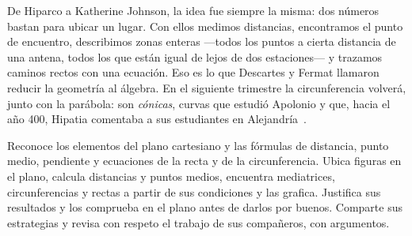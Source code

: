 \documentclass[11pt]{article}
\begin{document}

De Hiparco a Katherine Johnson, la idea fue siempre la misma: dos números
bastan para ubicar un lugar. Con ellos medimos distancias, encontramos el punto
de encuentro, describimos zonas enteras —todos los puntos a cierta distancia de
una antena, todos los que están igual de lejos de dos estaciones— y trazamos caminos
rectos con una ecuación. Eso es lo que Descartes y Fermat llamaron reducir la
geometría al álgebra. En el siguiente trimestre la circunferencia volverá, junto
con la parábola: son \emph{cónicas}, curvas que estudió Apolonio y que, hacia el
año 400, Hipatia comentaba a sus estudiantes en Alejandría~\cite{dzielska}.

\matrizevaluacion
  {Reconoce los elementos del plano cartesiano y las fórmulas de distancia,
   punto medio, pendiente y ecuaciones de la recta y de la circunferencia.}
  {Ubica figuras en el plano, calcula distancias y puntos medios, encuentra
   mediatrices, circunferencias y rectas a partir de sus condiciones y las
   grafica.}
  {Justifica sus resultados y los comprueba en el plano antes de darlos por
   buenos.}
  {Comparte sus estrategias y revisa con respeto el trabajo de sus compañeros,
   con argumentos.}

\autoevaluacion

\seguimientodocente
\end{document}
